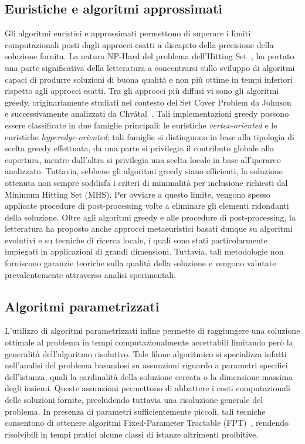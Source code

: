 \subsection*{Euristiche e algoritmi approssimati}

Gli algoritmi euristici e approssimati permettono di superare i limiti computazionali posti dagli approcci esatti a discapito della precisione della soluzione fornita.
La natura NP-Hard del problema dell'Hitting Set~\cite{karp1972}, ha portato una parte significativa della letteratura a concentrarsi sullo sviluppo di algoritmi capaci di produrre soluzioni di buona qualità e non più ottime in tempi inferiori rispetto agli approcci esatti.
Tra gli approcci più diffusi vi sono gli algoritmi greedy, originariamente studiati nel contesto del Set Cover Problem da Johnson~\cite{johnson1974} e successivamente analizzati da Chvátal~\cite{chvatal1979}.
Tali implementazioni greedy possono essere classificate in due famiglie principali: le euristiche \textit{vertex-oriented} e le euristiche \textit{hyperedge-oriented}; tali famiglie si distinguono in base alla tipologia di scelta greedy effettuata, da una parte si privilegia il contributo globale alla copertura, mentre dall'altra si privilegia una scelta locale in base all'iperarco analizzato.
Tuttavia, sebbene gli algoritmi greedy siano efficienti, la soluzione ottenuta non sempre soddisfa i criteri di minimalità per inclusione richiesti dal Minimum Hitting Set (MHS).
Per ovviare a questo limite, vengono spesso applicate procedure di post-processing volte a eliminare gli elementi ridondanti della soluzione.
Oltre agli algoritmi greedy e alle procedure di post-processing, la letteratura ha proposto anche approcci metaeuristici basati dunque su algoritmi evolutivi e su tecniche di ricerca locale, i quali sono stati particolarmente impiegati in applicazioni di grandi dimensioni.
Tuttavia, tali metodologie non forniscono garanzie teoriche sulla qualità della soluzione e vengono valutate prevalentemente attraverso analisi sperimentali.

\subsection*{Algoritmi parametrizzati}

L'utilizzo di algoritmi parametrizzati infine permette di raggiungere una soluzione ottimale al problema in tempi computazionalmente accettabili limitando però la generalità dell'algoritmo risolutivo.
Tale filone algoritmico si specializza infatti nell'analisi del problema basandosi su assunzioni riguardo a parametri specifici dell'istanza, quali la cardinalità della soluzione cercata o la dimensione massima degli insiemi.
Queste assunzioni permettono di abbattere i costi computazionali delle soluzioni fornite, precludendo tuttavia una risoluzione generale del problema.
In presenza di parametri sufficientemente piccoli, tali tecniche consentono di ottenere algoritmi Fixed-Parameter Tractable (FPT)~\cite{downey2013}, rendendo risolvibili in tempi pratici alcune classi di istanze altrimenti proibitive.


